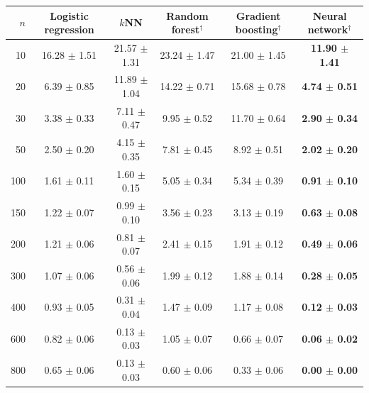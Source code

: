\begin{tabular}{rccccc}
\toprule
$n$ & Logistic regression & $k$NN & Random forest$^\dagger$ & Gradient boosting$^\dagger$ & Neural network$^\dagger$ \\
\midrule
10 & 16.28 $\pm$ 1.51 & 21.57 $\pm$ 1.31 & 23.24 $\pm$ 1.47 & 21.00 $\pm$ 1.45 & \textbf{11.90 $\pm$ 1.41} \\
20 & 6.39 $\pm$ 0.85 & 11.89 $\pm$ 1.04 & 14.22 $\pm$ 0.71 & 15.68 $\pm$ 0.78 & \textbf{4.74 $\pm$ 0.51} \\
30 & 3.38 $\pm$ 0.33 & 7.11 $\pm$ 0.47 & 9.95 $\pm$ 0.52 & 11.70 $\pm$ 0.64 & \textbf{2.90 $\pm$ 0.34} \\
50 & 2.50 $\pm$ 0.20 & 4.15 $\pm$ 0.35 & 7.81 $\pm$ 0.45 & 8.92 $\pm$ 0.51 & \textbf{2.02 $\pm$ 0.20} \\
100 & 1.61 $\pm$ 0.11 & 1.60 $\pm$ 0.15 & 5.05 $\pm$ 0.34 & 5.34 $\pm$ 0.39 & \textbf{0.91 $\pm$ 0.10} \\
150 & 1.22 $\pm$ 0.07 & 0.99 $\pm$ 0.10 & 3.56 $\pm$ 0.23 & 3.13 $\pm$ 0.19 & \textbf{0.63 $\pm$ 0.08} \\
200 & 1.21 $\pm$ 0.06 & 0.81 $\pm$ 0.07 & 2.41 $\pm$ 0.15 & 1.91 $\pm$ 0.12 & \textbf{0.49 $\pm$ 0.06} \\
300 & 1.07 $\pm$ 0.06 & 0.56 $\pm$ 0.06 & 1.99 $\pm$ 0.12 & 1.88 $\pm$ 0.14 & \textbf{0.28 $\pm$ 0.05} \\
400 & 0.93 $\pm$ 0.05 & 0.31 $\pm$ 0.04 & 1.47 $\pm$ 0.09 & 1.17 $\pm$ 0.08 & \textbf{0.12 $\pm$ 0.03} \\
600 & 0.82 $\pm$ 0.06 & 0.13 $\pm$ 0.03 & 1.05 $\pm$ 0.07 & 0.66 $\pm$ 0.07 & \textbf{0.06 $\pm$ 0.02} \\
800 & 0.65 $\pm$ 0.06 & 0.13 $\pm$ 0.03 & 0.60 $\pm$ 0.06 & 0.33 $\pm$ 0.06 & \textbf{0.00 $\pm$ 0.00} \\
\bottomrule
\end{tabular}
